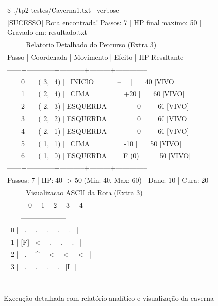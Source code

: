 \documentclass[12pt,a4paper]{article}
\makeatletter
\DeclareRobustCommand{\_}{%
  \ifmmode
    \nfss@text{\textunderscore}%
  \else
    \textunderscore\allowbreak
  \fi
}
\makeatother
\begin{document}
\begin{figure}[htbp]
    \centering
    \begin{minipage}{0.85\textwidth}
        \ttfamily\small
        \begin{tabular}{|l|}
        \hline
        \$ ./tp2 testes/Caverna1.txt --verbose \\
        {[SUCESSO]} Rota encontrada! Passos: 7 | HP final maximo: 50 | Gravado em: resultado.txt \\[0.15cm]
        === Relatorio Detalhado do Percurso (Extra 3) === \\
        Passo | Coordenada | Movimento | Efeito  | HP Resultante \\
        ------+------------+-----------+---------+-------------- \\
        \ \ \ \ 0 | \ \ ( 3, \ 4) | \ INICIO \ \ | \ \ \ -- \ \ | \ \ \ 40 [VIVO] \\
        \ \ \ \ 1 | \ \ ( 2, \ 4) | \ CIMA \ \ \ \ | \ \ \ \ +20 | \ \ \ 60 [VIVO] \\
        \ \ \ \ 2 | \ \ ( 2, \ 3) | ESQUERDA \ | \ \ \ \ \ \ 0 | \ \ \ 60 [VIVO] \\
        \ \ \ \ 3 | \ \ ( 2, \ 2) | ESQUERDA \ | \ \ \ \ \ \ 0 | \ \ \ 60 [VIVO] \\
        \ \ \ \ 4 | \ \ ( 2, \ 1) | ESQUERDA \ | \ \ \ \ \ \ 0 | \ \ \ 60 [VIVO] \\
        \ \ \ \ 5 | \ \ ( 1, \ 1) | \ CIMA \ \ \ \ | \ \ \ \ -10 | \ \ \ 50 [VIVO] \\
        \ \ \ \ 6 | \ \ ( 1, \ 0) | ESQUERDA \ | \ \ F (0) \ | \ \ \ 50 [VIVO] \\
        ------+------------+-----------+---------+-------------- \\
        Passos: 7 | HP: 40 -> 50 (Min: 40, Max: 60) | Dano: 10 | Cura: 20 \\[0.15cm]
        === Visualizacao ASCII da Rota (Extra 3) === \\
        \ \ \ \ \ \ 0 \ \ 1 \ \ 2 \ \ 3 \ \ 4 \\
        \ \ \ \ -------------------- \\
        \ 0 | \ . \ \ . \ \ . \ \ . \ \ . \ | \\
        \ 1 | [F] \ < \ \ . \ \ . \ \ . \ | \\
        \ 2 | \ . \ \ \^{} \ \ < \ \ < \ \ < \ | \\
        \ 3 | \ . \ \ . \ \ . \ \ . \ [I] | \\
        \ \ \ \ -------------------- \\
        \hline
        \end{tabular}
    \end{minipage}
    \vspace{0.2cm}
    \caption{Execução detalhada com relatório analítico e visualização da caverna}
    \label{fig:exec_verbose}
\end{figure}
\end{document}
